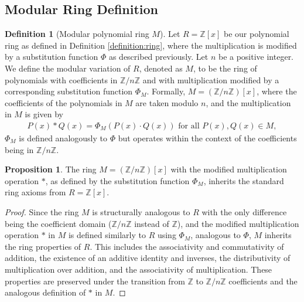 \documentclass{article}
\theoremstyle{plain}
\theoremstyle{definition}
\newtheorem{definition}{Definition}
\newtheorem{proposition}{Proposition}
\begin{document}
\subsection{Modular Ring Definition}
\begin{definition}[Modular polynomial ring $M$]  \label{definition:modularring}
Let \( R = \mathbb{Z}[x] \) be our polynomial ring as defined in Definition \ref{definition:ring}, where the multiplication is modified by a substitution function \(\Phi\) as described previously. Let \( n \) be a positive integer. We define the modular variation of \( R \), denoted as \( M \), to be the ring of polynomials with coefficients in \( \mathbb{Z}/n\mathbb{Z} \) and with multiplication modified by a corresponding substitution function \(\Phi_M\). Formally, \( M = (\mathbb{Z}/n\mathbb{Z})[x] \), where the coefficients of the polynomials in \( M \) are taken modulo \( n \), and the multiplication in \( M \) is given by
\begin{align}
    P(x) \ast Q(x) = \Phi_M(P(x) \cdot Q(x)) \text{ for all } P(x), Q(x) \in M,
\end{align}
\(\Phi_M\) is defined analogously to \(\Phi\) but operates within the context of the coefficients being in \( \mathbb{Z}/n\mathbb{Z} \).
\end{definition}

\begin{proposition} \label{proposition:modularring:1}
The ring \( M = (\mathbb{Z}/n\mathbb{Z})[x] \) with the modified multiplication operation \(\ast\), as defined by the substitution function \(\Phi_M\), inherits the standard ring axioms from \( R = \mathbb{Z}[x] \).
\end{proposition}
\begin{proof}
Since the ring \( M \) is structurally analogous to \( R \) with the only difference being the coefficient domain (\(\mathbb{Z}/n\mathbb{Z}\) instead of \(\mathbb{Z}\)), and the modified multiplication operation \(\ast\) in \( M \) is defined similarly to \( R \) using \(\Phi_M\), analogous to \(\Phi\), \( M \) inherits the ring properties of \( R \). This includes the associativity and commutativity of addition, the existence of an additive identity and inverses, the distributivity of multiplication over addition, and the associativity of multiplication. These properties are preserved under the transition from \(\mathbb{Z}\) to \(\mathbb{Z}/n\mathbb{Z}\) coefficients and the analogous definition of \(\ast\) in \( M \).
\end{proof}
\end{document}
